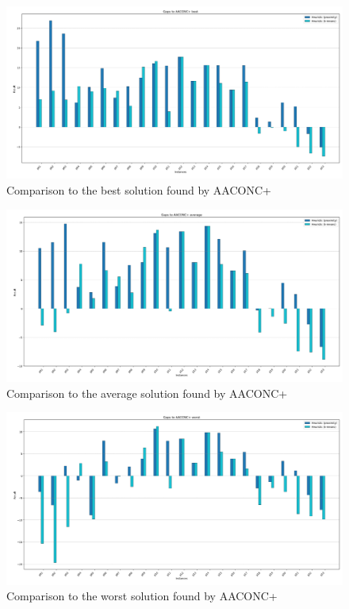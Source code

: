 \documentclass{article}
\begin{document}
	\begin{figure}[h!]
		\centering
		\caption{Comparison to the best solution found by AACONC+}
		\includegraphics[width=\textwidth]{heuristics_comp_to_best_gaps}
	\end{figure}
	\begin{figure}[h!]
		\centering
		\caption{Comparison to the average solution found by AACONC+}
		\includegraphics[width=\textwidth]{heuristics_comp_to_avg_gaps}
	\end{figure}
	\begin{figure}[h!]
		\centering
		\caption{Comparison to the worst solution found by AACONC+}
		\includegraphics[width=\textwidth]{heuristics_comp_to_worst_gaps}
	\end{figure}
\end{document}
